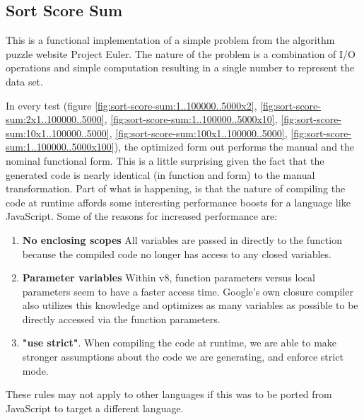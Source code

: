 \subsection{Sort Score Sum}
This is a functional implementation of a simple problem from the algorithm puzzle website Project Euler.  The nature of the problem is a combination of I/O operations and simple computation resulting in a single number to represent the data set. \cite{euler05}

In every test (figure \ref{fig:sort-score-sum:1..100000..5000x2}, \ref{fig:sort-score-sum:2x1..100000..5000}, \ref{fig:sort-score-sum:1..100000..5000x10}, \ref{fig:sort-score-sum:10x1..100000..5000}, \ref{fig:sort-score-sum:100x1..100000..5000}, \ref{fig:sort-score-sum:1..100000..5000x100}), the optimized form out performs the manual and the nominal functional form.  This is a little surprising given the fact that the generated code is nearly identical (in function and form) to the manual transformation.  Part of what is happening,  is that the nature of compiling the code at runtime affords some interesting performance boosts for a language like JavaScript. Some of the reasons for increased performance are:
\begin{enumerate}
  \item \textbf{No enclosing scopes} All variables are passed in directly to the function because the compiled code no longer has access to any closed variables.
  \item \textbf{Parameter variables}  Within v8, function parameters versus local parameters seem to have a faster access time.  Google's own closure compiler also utilizes this knowledge and optimizes as many variables as possible to be directly accessed via the function parameters. 
  \item \textbf{"use strict"}.  When compiling the code at runtime, we are able to make stronger assumptions about the code we are generating, and enforce strict mode.     
\end{enumerate}

These rules may not apply to other languages if this was to be ported from JavaScript to target a different language.